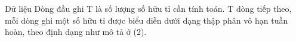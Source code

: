 Dữ liệu  
Dòng đầu ghi T là số lượng số hữu tỉ cần tính toán. T dòng tiếp theo, mỗi dòng ghi một số hữu tỉ được biểu diễn dưới dạng thập phân vô hạn tuần hoàn, theo định dạng như mô tả ở (2).
